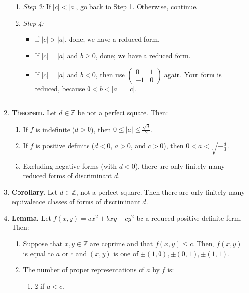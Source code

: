 \documentclass[11pt]{article}
\theoremstyle{definition}
\theoremstyle{named}
\begin{document}
\begin{enumerate}
\begin{enumerate}
        \item \textit{Step 3: } If $|c| < |a|$, go back to Step 1. Otherwise, continue. 
        \item \textit{Step 4: }
        \begin{itemize}
            \item If $|c| > |a|$, done; we have a reduced form. 
            \item If $|c| = |a|$ and $b \geq 0$, done; we have a reduced form. 
            \item If $|c| = |a|$ and $b < 0$, then use $\begin{pmatrix}
                0 & 1 \\
                -1 & 0
            \end{pmatrix}$ again. Your form is reduced, because $0 < b < |a| = |c|$. 
        \end{itemize}
    \end{enumerate}
    \begin{center}
        \hrule
    \end{center}
    \item \textbf{Theorem. } Let $d \in \mathbb{Z}$ be not a perfect square. Then: 
    \begin{enumerate}
        \item If $f$ is indefinite ($d>0$), then $0 \leq |a| \leq \frac{\sqrt{d}}{2}$. 
        \item If $f$ is positive definite ($d<0$, $a>0$, and $c>0$), then $0 < a < \sqrt{-\frac{d}{3}}$. 
        \item Excluding negative forms (with $d<0$), there are only finitely many reduced forms of discriminant $d$. 
    \end{enumerate}
    \item \textbf{Corollary. } Let $d \in \mathbb{Z}$, not a perfect square. Then there are only finitely many equivalence classes of forms of discriminant $d$.
    \item \textbf{Lemma. } Let $f(x,y) = ax^2 + bxy + cy^2$ be a reduced positive definite form. Then: 
    \begin{enumerate}
        \item Suppose that $x,y \in \mathbb{Z}$ are coprime and that $f(x,y) \leq c$. Then, $f(x,y)$ is equal to $a$ or $c$ and $(x,y)$ is one of $\pm(1,0), \pm(0,1), \pm(1,1)$. 
        \item The number of proper representations of $a$ by $f$ is: 
        \begin{enumerate}
            \item 2 if $a<c$.

\end{enumerate}
\end{enumerate}
\end{enumerate}
\end{document}
